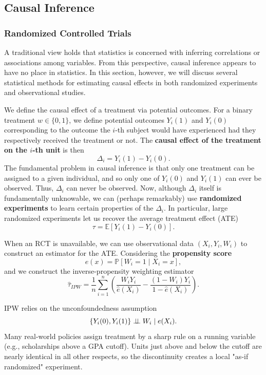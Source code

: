 \subsection{Causal Inference}
\subsubsection{Randomized Controlled Trials}
A traditional view holds that statistics is concerned with inferring correlations or associations among variables. From this perspective, causal inference appears to have no place in statistics. In this section, however, we will discuss several statistical methods for estimating causal effects in both randomized experiments and observational studies.

We define the causal effect of a treatment via potential outcomes. For a binary treatment $w \in \{0, 1\}$, we define potential outcomes $Y_i(1)$ and $Y_i(0)$ corresponding to the outcome the $i$-th subject would have experienced had they respectively received the treatment or not. The \textbf{causal effect of the treatment on the $i$-th unit} is then
\[
    \Delta_i = Y_i(1) - Y_i(0).
\]
The fundamental problem in causal inference is that only one treatment can be assigned to a given individual, and so only one of $Y_i(0)$ and $Y_i(1)$ can ever be observed. Thus, $\Delta_i$ can never be observed.
Now, although $\Delta_i$ itself is fundamentally unknowable, we can (perhaps remarkably) use \textbf{randomized experiments} to learn certain properties of the $\Delta_i$. In particular, large randomized experiments let us recover the average treatment effect (ATE)
\[
    \tau = \mathbb{E}\left[Y_i(1) - Y_i(0)\right].
\]

\textit{}When an RCT is unavailable, we can use observational data  $(X_i,Y_i,W_i)$ to construct an estimator for the ATE. 
Considering the \textbf{propensity score}
\[
e(x) = \mathbb{P}\left[W_i = 1 \mid X_i = x\right],
\]
and we construct the inverse-propensity weighting estimator
\[
\hat{\tau}_{IPW} = \frac{1}{n} \sum_{i=1}^{n} \left( \frac{W_i Y_i}{\hat{e}(X_i)} - \frac{(1 - W_i) Y_i}{1 - \hat{e}(X_i)} \right).
\]
\begin{rem}
    IPW relies on the unconfoundedness assumption
    \[
    \{Y_i(0), Y_i(1)\} \perp\!\!\!\perp W_i \mid e(X_i).
    \]
    Many real-world policies assign treatment by a sharp rule on a running variable (e.g., scholarships above a GPA cutoff). Units just above and below the cutoff are nearly identical in all other respects, so the discontinuity creates a local "as-if randomized" experiment.
\end{rem}



